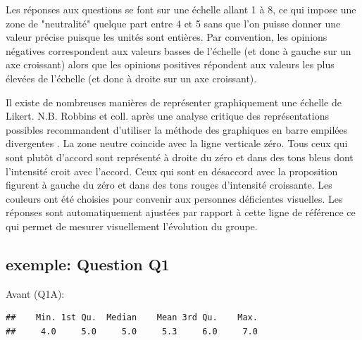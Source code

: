 \documentclass[12pt,english,french]{article}\usepackage{graphicx, color}
\makeatletter
\newenvironment{kframe}{%
 \def\at@end@of@kframe{}%
 \ifinner\ifhmode%
  \def\at@end@of@kframe{\end{minipage}}%
  \begin{minipage}{\columnwidth}%
 \fi\fi%
 \def\FrameCommand##1{\hskip\@totalleftmargin \hskip-\fboxsep
 \colorbox{shadecolor}{##1}\hskip-\fboxsep
     \hskip-\linewidth \hskip-\@totalleftmargin \hskip\columnwidth}%
 \MakeFramed {\advance\hsize-\width
   \@totalleftmargin\z@ \linewidth\hsize
   \@setminipage}}%
 {\par\unskip\endMakeFramed%
 \at@end@of@kframe}
\newenvironment{knitrout}{}{} %
\makeatother
\begin{document}
Les réponses aux questions se font sur une échelle allant 1 à 8, ce qui impose une zone de "neutralité" quelque part entre 4 et 5 sans que l'on puisse donner une valeur précise puisque les unités sont entières. Par convention, les opinions négatives correspondent aux valeurs basses de l'échelle (et donc à gauche sur un axe croissant) alors que les opinions positives répondent aux valeurs les plus élevées de l'échelle (et donc à droite sur un axe croissant).

Il existe de nombreuses manières de représenter graphiquement une échelle de Likert. N.B. Robbins et coll. après une analyse critique des représentations possibles recommandent d'utiliser la méthode des graphiques en barre empilées divergentes \cite{1}.
La zone neutre coincide avec la ligne verticale zéro. Tous ceux qui sont plutôt d'accord sont représenté à droite du zéro et dans des tons bleus dont l'intensité croit avec l'accord. Ceux qui sont en désaccord avec la proposition figurent à gauche du zéro et dans des tons rouges d'intensité croissante. Les couleurs ont été choisies pour convenir aux personnes déficientes visuelles. Les réponses sont automatiquement ajustées par rapport à cette ligne de référence ce qui permet de mesurer visuellement l'évolution du groupe.

\subsection{exemple: Question Q1}



Avant (Q1A):
\begin{knitrout}
\color{fgcolor}\begin{kframe}
\begin{verbatim}
##    Min. 1st Qu.  Median    Mean 3rd Qu.    Max. 
##     4.0     5.0     5.0     5.3     6.0     7.0
\end{verbatim}
\end{kframe}
\end{knitrout}
\end{document}
